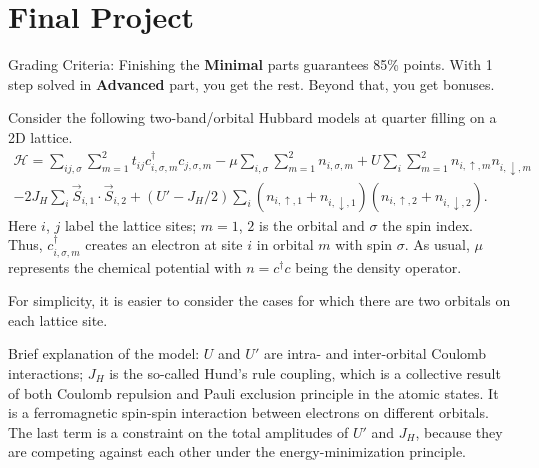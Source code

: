 
\chapter{Final Project}

\begingroup \linespread{.4}\selectfont
Grading Criteria: Finishing the \textbf{Minimal} parts guarantees 85\% points.
With 1 step solved in \textbf{Advanced} part, you get the rest. Beyond that, you
get bonuses.
\endgroup

\begin{problem}
  Consider the following two-band/orbital Hubbard models at quarter filling on a
  2D lattice.
  \begin{multline*}
    \mathcal H
  = \sum_{ij,\sigma} \sum_{m=1}^2 t_{ij}
    c_{i,\sigma,m}^\dagger c_{j,\sigma,m}
  - \mu \sum_{i,\sigma} \sum_{m=1}^2 n_{i,\sigma,m}
  + U\sum_i \sum_{m=1}^2 n_{i,\uparrow,m} n_{i,\downarrow, m}\\
  - 2J_H \sum_i \vec S_{i,1} \cdot \vec S_{i,2}
  + (U' - J_H/2) \sum_i (n_{i,\uparrow,1} + n_{i,\downarrow,1})
    (n_{i,\uparrow,2} + n_{i,\downarrow,2}).
  \end{multline*}
  Here $i$, $j$ label the lattice sites; $m = 1$, $2$ is the orbital
  and $\sigma$ the spin index. Thus, $c_{i,\sigma,m}^\dagger$ creates an
  electron at site $i$ in orbital $m$ with spin $\sigma$.
  As usual, $\mu$ represents the chemical potential with $n = c^\dagger c$
  being the density operator.

  For simplicity, it is easier to consider the cases for which there are two
  orbitals on each lattice site.

  Brief explanation of the model: $U$ and $U'$ are intra- and inter-orbital
  Coulomb interactions; $J_H$ is the so-called Hund's rule coupling, which is a
  collective result of both Coulomb repulsion and Pauli exclusion principle in
  the atomic states. It is a ferromagnetic spin-spin interaction between
  electrons on different orbitals. The last term is a constraint on the total
  amplitudes of $U'$ and $J_H$, because they are competing against each other
  under the energy-minimization principle.


\end{problem}
